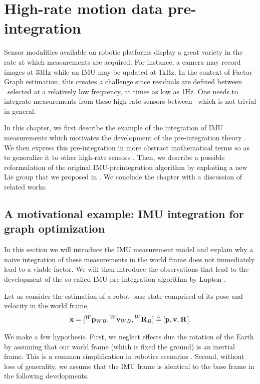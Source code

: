 \chapter{High-rate motion data pre-integration}
\label{chp:preintegration}
\minitoc
\bigskip


Sensor modalities available on robotic platforms display a great variety in the rate at which measurements are acquired. For instance, 
a camera may record images at 33Hz while an IMU may be updated at 1kHz. In the context of Factor Graph estimation, this creates a challenge since residuals
are defined between \keyframes\ selected at a relatively low frequency, at times as low as 1Hz. One needs to integrate measurements from these high-rate sensors between \keyframes\,
which is not trivial in general.

In this chapter, we first describe the example of the integration of IMU measurements which motivates the development of the pre-integration theory \cite{lupton-09,forster2017-TRO}.
We then express this pre-integration in more abstract mathematical terms so as to generalize it to other high-rate sensors \cite{atchuthan-18-thesis}. 
Then, we describe a possible reformulation of the original IMU-preintegration algorithm \cite{forster2017-TRO} by exploiting a new Lie group that we 
proposed in \cite{fourmy2019absolute}. We conclude the chapter with a discussion of related works.

  
\section{A motivational example: IMU integration for graph optimization}
\label{sec:imu_preint_motivation}

In this section we will introduce the IMU measurement model and explain why a naive integration of these measurements in the world frame does not immediately
lead to a viable factor. We will then introduce the observations that lead to the development of the so-called IMU pre-integration algorithm by Lupton \cite{lupton-09}.

Let us consider the estimation of a robot base state comprised of its pose and velocity in the world frame,
%
\begin{equation}
    {\bf x} = [\prescript{W}{}{{\bf p}}_{WB}, \prescript{W}{}{{\bf v}}_{WB}, \prescript{W}{}{{\bf R}}_{B}]
    \triangleq 
    [{\bf p}, {\bf v}, \prescript{}{}{{\bf R}}_{}].
\end{equation}

We make a few hypothesis. First, we neglect effects due the rotation of the Earth by assuming 
that our world frame (which is fixed \wrt the ground) is an inertial frame. This is a common simplification in robotics scenarios \cite{forster2017-TRO}. 
Second, without loss of generality, we assume that the IMU frame is identical to the base frame in the following developments.

